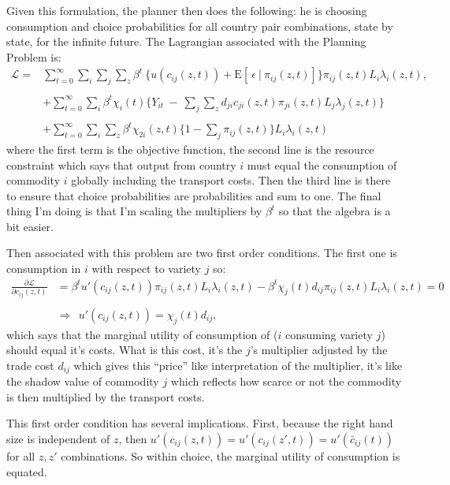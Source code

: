 \documentclass[12pt,pdftex]{article}
\begin{document}
\begin{onehalfspacing}
Given this formulation, the planner then does the following: he is choosing consumption and choice probabilities for all country pair combinations, state by state, for the infinite future. The Lagrangian associated with the Planning Problem is:
\begin{align}
\mathcal{L}  = & \sum_{t=0}^{\infty}   \sum_{i} \sum_{j} \sum\limits_{z} \beta^{t} \  \bigg \{  u(c_{ij}(z, t) ) + \mathrm{E}[ \ \epsilon \ | \ \pi_{ij}(z,t) ] \bigg \}\pi_{ij}(z,t) L_{i} \lambda_{i}(z, t), \\
\nonumber \\
&+ \sum_{t=0}^{\infty} \sum_{i} \beta^{t} \chi_{i}(t) \bigg \{ Y_{it} \  - \ \sum_{j} \sum_{z} d_{ji} c_{ji}(z, t) \pi_{ji}(z,t) L_{j}\lambda_{j}(z, t) \bigg \} \nonumber \\
\nonumber \\
&+ \sum_{t=0}^{\infty} \sum_{i} \sum\limits_{z} \beta^{t} \chi_{2i}(z,t) \bigg \{1 - \sum_{j}\pi_{ij}(z,t) \bigg \} L_{i} \lambda_{i}(z, t) \nonumber
\label{eq:planning-problem}
\end{align}
where the first term is the objective function, the second line is the resource constraint which says that output from country $i$ must equal the consumption of commodity $i$ globally including the transport costs. Then the third line is there to ensure that choice probabilities are probabilities and sum to one. The final thing I'm doing is that I'm scaling the multipliers by $\beta^t$ so that the algebra is a bit easier.

Then associated with this problem are two first order conditions. The first one is consumption in $i$ with respect to variety $j$ so:
\begin{align}
\frac{\partial \mathcal{L} }{\partial c_{ij}(z, t)} &=  \beta^{t} u'(c_{ij}(z, t)) \pi_{ij}(z,t) L_{i} \lambda_{i}(z, t) - \beta^{t} \chi_{j}(t) d_{ij} \pi_{ij}(z,t) L_{i} \lambda_{i}(z, t) = 0 \\
\nonumber \\
& \Rightarrow \ \ u'(c_{ij}(z, t) ) = \chi_{j}(t) d_{ij},
\end{align}
which says that the marginal utility of consumption of ($i$ consuming variety $j$) should equal it's costs. What is this cost, it's the $j$'s multiplier adjusted by the trade cost $d_{ij}$ which gives this ``price'' like interpretation of the multiplier, it's like the shadow value of commodity $j$ which reflects how scarce or not the commodity is then multiplied by the transport costs.  

This first order condition has several implications. First, because the right hand size is independent of $z$, then $u'(c_{ij}(z, t)) = u'(c_{ij}(z', t)) = u'(\bar c_{ij}(t))$ for all $z, z'$ combinations. So within choice, the marginal utility of consumption is equated.


\end{onehalfspacing}
\end{document}
